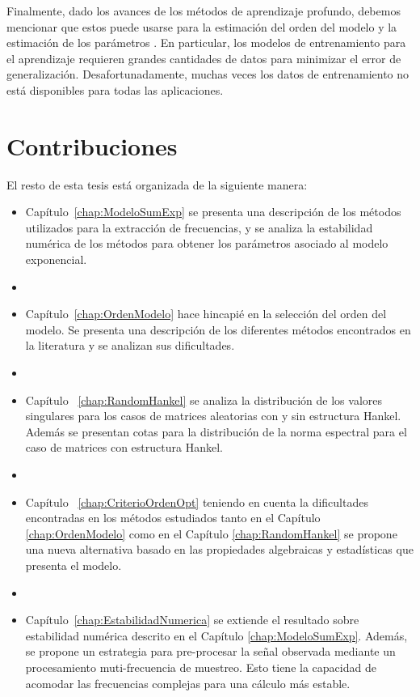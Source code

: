 Finalmente, dado los avances de los métodos de aprendizaje profundo, debemos mencionar que estos puede usarse para la estimación del orden del modelo \cite{Moon2021} y la estimación de los parámetros \cite{Mhaska2020}. En particular, los modelos de entrenamiento para el aprendizaje requieren grandes cantidades de datos para minimizar el error de generalización. Desafortunadamente, muchas veces los datos de entrenamiento no está disponibles para todas las aplicaciones.

\section{Contribuciones}

El resto de esta tesis está organizada de la siguiente manera:

\begin{itemize}
	\item Capítulo~\ref{chap:ModeloSumExp} se presenta una descripción de los métodos utilizados para la extracción de frecuencias, y se analiza la estabilidad numérica de los métodos para obtener los parámetros asociado al modelo exponencial. 
	\item[] 
	\item Capítulo~\ref{chap:OrdenModelo} hace hincapié en la selección del orden del modelo. Se presenta una descripción de los diferentes métodos encontrados en la literatura y se analizan sus dificultades. 
	\item[] 
    \item Capítulo ~\ref{chap:RandomHankel} se analiza la distribución de los valores singulares para los casos de matrices aleatorias con y sin estructura Hankel. Además se presentan cotas para la distribución de la norma espectral para el caso de matrices con estructura Hankel. 
    \item[]
	\item Capítulo ~\ref{chap:CriterioOrdenOpt} teniendo en cuenta la dificultades encontradas en los métodos estudiados tanto en el Capítulo \ref{chap:OrdenModelo} como en el Capítulo \ref{chap:RandomHankel} se propone una nueva alternativa basado en las propiedades algebraicas y estadísticas que presenta el modelo.
	\item[] 
	\item Capítulo~\ref{chap:EstabilidadNumerica} se extiende el resultado sobre estabilidad numérica descrito en el Capítulo \ref{chap:ModeloSumExp}. Además, se propone un estrategia para pre-procesar la señal observada mediante un procesamiento muti-frecuencia de muestreo. Esto tiene la capacidad de acomodar las frecuencias complejas para una cálculo más estable.

\end{itemize}
